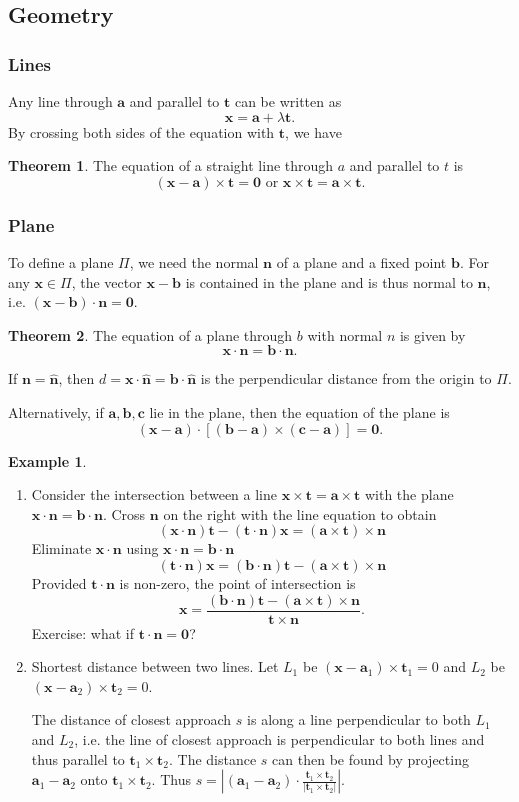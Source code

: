 \documentclass[a4paper]{article}
\theoremstyle{definition}
\newtheorem*{thm}{Theorem}
\newtheorem*{eg}{Example}
\newcommand{\mb}[1]{\mathbf{#1}}
\begin{document}
\subsection{Geometry}
\subsubsection{Lines}
Any line through $\mb{a}$ and parallel to $\mb{t}$ can be written as
\[
\mb{x} = \mb{a} + \lambda\mb{t}.
\]
By crossing both sides of the equation with $\mb{t}$, we have
\begin{thm} The equation of a straight line through $a$ and parallel to $t$ is
  \[
  \mb{(x - a)\times t = 0}\text{ or }\mb{x\times t = a\times t}.
  \]
\end{thm}
\subsubsection{Plane}
To define a plane $\Pi$, we need the normal $\mb{n}$ of a plane and a fixed point $\mb{b}$.  For any $\mb{x}\in \Pi$, the vector $\mb{x - b}$ is contained in the plane and is thus normal to $\mb{n}$, i.e. $\mb{(x - b)\cdot n = 0}$.
\begin{thm}
  The equation of a plane through $b$ with normal $n$ is given by
  \[
  \mb{x\cdot n = b\cdot n}.
  \]
\end{thm}
If $\mb{n = \hat n}$, then $d = \mb{x\cdot\hat{n} = b\cdot\hat{n}}$ is the perpendicular distance from the origin to $\Pi$.

Alternatively, if $\mb{a, b, c}$ lie in the plane, then the equation of the plane is
\[
\mb{(x - a)\cdot [(b - a)\times (c - a)] = 0}.
\]

\begin{eg}\leavevmode
  \begin{enumerate}
  \item Consider the intersection between a line $\mb{x\times t = a\times t}$ with the plane $\mb{x\cdot n = b\cdot n}$. Cross $\mb{n}$ on the right with the line equation to obtain
    \[
    \mb{(x\cdot n)t - (t\cdot n)x = (a\times t)\times n}
    \]
    Eliminate $\mb{x\cdot n}$ using $\mb{x\cdot n = b\cdot n}$
    \[
    \mb{(t\cdot n)x = (b\cdot n)t - (a\times t)\times n}
    \]
    Provided $\mb{t\cdot n}$ is non-zero, the point of intersection is
    \[
    \mb{x = \frac{(b\cdot n)t - (a\times t)\times n}{t\times n}}.
    \]
    Exercise: what if $\mb{t\cdot n = 0}$?
  \item Shortest distance between two lines. Let $L_1$ be $(\mb{x} - \mb{a}_1)\times \mb{t}_1 = 0$ and $L_2$ be $(\mb{x} - \mb{a}_2)\times \mb{t}_2 = 0$.

    The distance of closest approach $s$ is along a line perpendicular to both $L_1$ and $L_2$, i.e. the line of closest approach is perpendicular to both lines and thus parallel to $\mb{t}_1\times \mb{t}_2$. The distance $s$ can then be found by projecting $\mb{a}_1 - \mb{a}_2$ onto $\mb{t}_1\times \mb{t}_2$. Thus $s = \left|(\mb{a}_1 - \mb{a}_2)\cdot\frac{\mb{t}_1\times \mb{t}_2}{|\mb{t}_1\times \mb{t}_2|}\right|$.
  \end{enumerate}
\end{eg}
\end{document}
